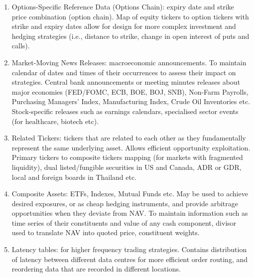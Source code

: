 \begin{enumerate}[label=\roman*.]
\item Options-Specific Reference Data (Options Chain): expiry date and strike price combination (option chain). Map of equity tickers to option tickers with strike and expiry dates allow for design for more complex investment and hedging strategies (i.e., distance to strike, change in open interest of puts and calls).
\item Market-Moving News Releases: macroeconomic announcements. To maintain calendar of dates and times of their occurrences to assess their impact on strategies. Central bank announcements or meeting minutes releases about major economies (FED/FOMC, ECB, BOE, BOJ, SNB), Non-Farm Payrolls, Purchasing Managers' Index, Manufacturing Index, Crude Oil Inventories etc.\\
Stock-specific releases such as earnings calendars, specialised sector events (for healthcare, biotech etc).
\item Related Tickers: tickers that are related to each other as they fundamentally represent the same underlying asset. Allows efficient opportunity exploitation. Primary tickers to composite tickers mapping (for markets with fragmented liquidity), dual listed/fungible securities in US and Canada, ADR or GDR, local and foreign boards in Thailand etc.
\item Composite Assets: ETFs, Indexes, Mutual Funds etc. May be used to achieve desired exposures, or as cheap hedging instruments, and provide arbitrage opportunities when they deviate from NAV. To maintain information such as time series of their constituents and value of any cash component, divisor used to translate NAV into quoted price, constituent weights.
\item Latency tables: for higher frequency trading strategies. Contains distribution of latency between different data centres for more efficient order routing, and reordering data that are recorded in different locations.
\end{enumerate}

